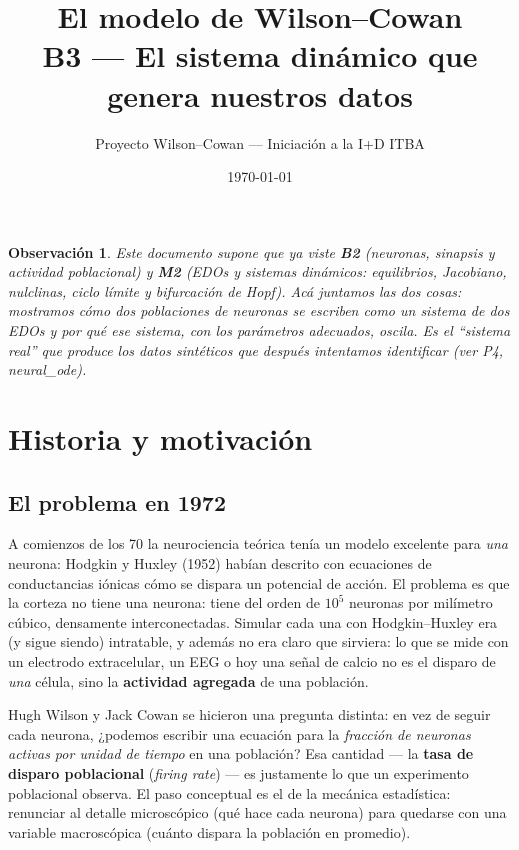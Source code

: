 \documentclass[11pt,a4paper]{article}
\title{\textbf{El modelo de Wilson--Cowan}\\[2pt]\large B3 --- El sistema dinámico que genera nuestros datos}
\author{Proyecto Wilson--Cowan --- Iniciación a la I+D ITBA}
\date{\today}
\newtheorem{remark}{Observación}
\begin{document}
\maketitle
\tableofcontents
\bigskip

\begin{remark}
Este documento supone que ya viste \textbf{B2} (neuronas, sinapsis y actividad poblacional) y \textbf{M2} (EDOs y sistemas dinámicos: equilibrios, Jacobiano, nulclinas, ciclo límite y bifurcación de Hopf). Acá juntamos las dos cosas: mostramos cómo dos poblaciones de neuronas se escriben como un sistema de dos EDOs y por qué ese sistema, con los parámetros adecuados, \emph{oscila}. Es el ``sistema real'' que produce los datos sintéticos que después intentamos identificar (ver P4, neural\_ode).
\end{remark}

\section{Historia y motivación}

\subsection{El problema en 1972}
A comienzos de los 70 la neurociencia teórica tenía un modelo excelente para \emph{una} neurona: Hodgkin y Huxley (1952) habían descrito con ecuaciones de conductancias iónicas cómo se dispara un potencial de acción. El problema es que la corteza no tiene una neurona: tiene del orden de $10^5$ neuronas por milímetro cúbico, densamente interconectadas. Simular cada una con Hodgkin--Huxley era (y sigue siendo) intratable, y además no era claro que sirviera: lo que se mide con un electrodo extracelular, un EEG o hoy una señal de calcio no es el disparo de \emph{una} célula, sino la \textbf{actividad agregada} de una población.

Hugh Wilson y Jack Cowan se hicieron una pregunta distinta: en vez de seguir cada neurona, ¿podemos escribir una ecuación para la \emph{fracción de neuronas activas por unidad de tiempo} en una población? Esa cantidad --- la \textbf{tasa de disparo poblacional} (\emph{firing rate}) --- es justamente lo que un experimento poblacional observa. El paso conceptual es el de la mecánica estadística: renunciar al detalle microscópico (qué hace cada neurona) para quedarse con una variable macroscópica (cuánto dispara la población en promedio).
\end{document}
